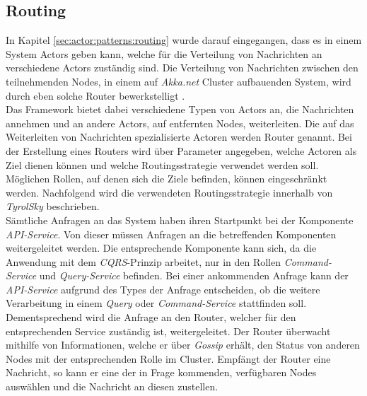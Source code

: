 \subsection{Routing}
\label{subsec:implementation:akkaRouting}
In Kapitel \ref{sec:actor:patterns:routing} wurde darauf eingegangen, dass es in einem System Actors geben kann, welche für die Verteilung von Nachrichten an verschiedene Actors zuständig sind. Die Verteilung von Nachrichten zwischen den teilnehmenden Nodes, in einem auf \textit{Akka.net} Cluster aufbauenden System, wird durch eben solche Router bewerkstelligt \citep{Akka.netCommunityAkka.NETDocumentation}. \\
Das Framework bietet dabei verschiedene Typen von Actors an, die Nachrichten annehmen und an andere Actors, auf entfernten Nodes, weiterleiten. Die auf das Weiterleiten von Nachrichten spezialisierte Actoren werden Router genannt. Bei der Erstellung eines Routers wird über Parameter angegeben, welche Actoren als Ziel dienen können und welche Routingsstrategie verwendet werden soll. Möglichen Rollen, auf denen sich die Ziele befinden, können eingeschränkt werden. Nachfolgend wird die verwendeten Routingsstrategie innerhalb von \textit{TyrolSky} beschrieben. \\
Sämtliche Anfragen an das System haben ihren Startpunkt bei der Komponente \textit{API-Service}. Von dieser müssen Anfragen an die betreffenden Komponenten weitergeleitet werden. Die entsprechende Komponente kann sich, da die Anwendung mit dem \textit{CQRS}-Prinzip arbeitet, nur in den Rollen \textit{Command-Service} und \textit{Query-Service} befinden. Bei einer ankommenden Anfrage kann der \textit{API-Service} aufgrund des Types der Anfrage entscheiden, ob die weitere Verarbeitung in einem \textit{Query} oder \textit{Command-Service} stattfinden soll. Dementsprechend wird die Anfrage an den Router, welcher für den entsprechenden Service zuständig ist, weitergeleitet. Der Router überwacht mithilfe von Informationen, welche er über \textit{Gossip} erhält, den Status von anderen Nodes mit der entsprechenden Rolle im Cluster. Empfängt der Router eine Nachricht, so kann er eine der in Frage kommenden, verfügbaren Nodes auswählen und die Nachricht an diesen zustellen. \\
% 
